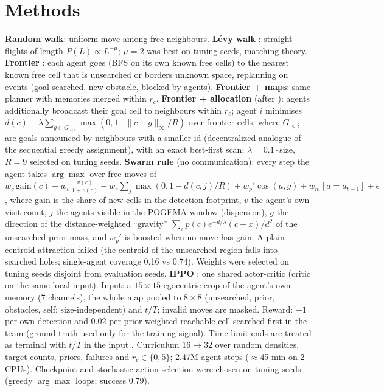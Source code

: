 \documentclass[10pt]{article}
\begin{document}
\section{Methods}
\textbf{Random walk}: uniform move among free neighbours. \textbf{L\'evy walk} \cite{viswanathan1999optimizing}: straight
flights of length $P(L)\propto L^{-\mu}$; $\mu=2$ was best on tuning seeds, matching theory.
\textbf{Frontier} \cite{yamauchi1997frontier,yamauchi1998multi}: each agent goes (BFS on its own known free cells) to the
nearest known free cell that is unsearched or borders unknown space, replanning on events (goal searched, new
obstacle, blocked by agents). \textbf{Frontier + maps}: same planner with memories merged within $r_c$.
\textbf{Frontier + allocation} (after \cite{burgard2005coordinated}): agents additionally broadcast their goal cell
to neighbours within $r_c$; agent $i$ minimises $d(c)+\lambda\sum_{g\in G_{<i}}\max(0,1-\|c-g\|_\infty/R)$ over
frontier cells, where $G_{<i}$ are goals announced by neighbours with a smaller id (decentralized analogue of the
sequential greedy assignment), with an exact best-first scan; $\lambda=0.1\cdot$size, $R=9$ selected on tuning seeds. \textbf{Swarm rule} (no communication): every step the agent takes
$\arg\max$ over free moves of
$w_g\,\text{gain}(c) - w_v\,\tfrac{v(c)}{1+v(c)} - w_r\sum_j\max(0,1-d(c,j)/R) + w_p'\cos(a,g) + w_m[a=a_{t-1}] + \epsilon$,
where gain is the share of new cells in the detection footprint, $v$ the agent's own visit count, $j$ the agents visible
in the POGEMA window (dispersion), $g$ the direction of the distance-weighted ``gravity''
$\sum_c p(c)e^{-d/\lambda}(c-x)/d^2$ of the unsearched prior mass, and $w_p'$ is boosted when no move has gain.
A plain centroid attraction failed (the centroid of the unsearched region falls into searched holes; single-agent
coverage 0.16 vs 0.74). Weights were selected on tuning seeds disjoint from evaluation seeds.
\textbf{IPPO} \cite{schulman2017ppo,dewitt2020independent}: one shared actor-critic (critic on the same local input). Input:
a $15\times15$ egocentric crop of the agent's own memory (7 channels), the whole map pooled to $8\times8$ (unsearched,
prior, obstacles, self; size-independent) and $t/T$; invalid moves are masked. Reward: $+1$ per own detection and
$0.02$ per prior-weighted reachable cell searched first in the team (ground truth used only for the training signal).
Time-limit ends are treated as terminal with $t/T$ in the input \cite{pardo2018time}. Curriculum $16\to32$ over random
densities, target counts, priors, failures and $r_c\in\{0,5\}$; 2.47M agent-steps ($\approx$45 min on 2 CPUs).
Checkpoint and stochastic action selection were chosen on tuning seeds (greedy $\arg\max$ loops; success 0.79).
\end{document}
